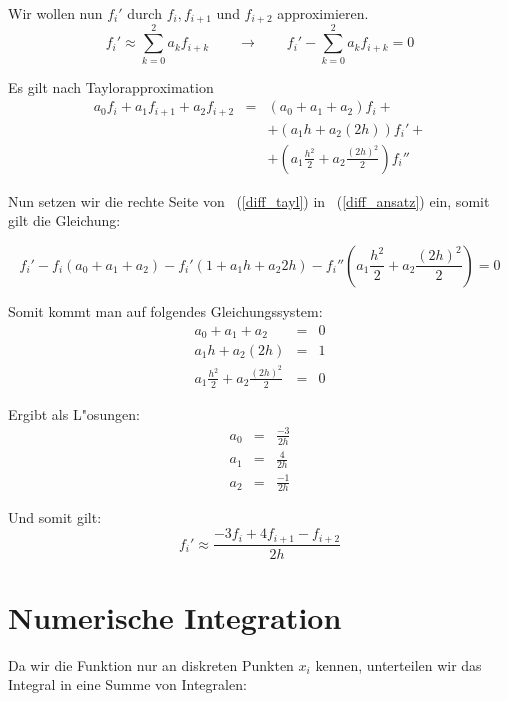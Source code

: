 \documentclass[german, 10pt, a4paper, twocolumn]{scrartcl}
\begin{document}
Wir wollen nun $f_i'$ durch $f_i,f_{i+1}$ und $f_{i+2}$ approximieren.
\begin{equation}
	f_i' \approx \sum^2_{k=0} a_k f_{i+k} \qquad \rightarrow \qquad f_i' - \sum^2_{k=0}a_kf_{i+k} = 0
	\label{diff_ansatz}	
\end{equation}

Es gilt nach Taylorapproximation
\begin{eqnarray}
	a_0f_i+a_1f_{i+1}+a_2f_{i+2} &  = &	(a_0+a_1+a_2)f_i + {} \nonumber \\
	& 				&	+ (a_1h+a_2(2h))f_i' + {} \nonumber \\
	&				&	+ \left ( a_1\frac{h^2}{2}+a_2\frac{(2h)^2}{2} \right ) f_i''
	\label{diff_tayl}
\end{eqnarray}

Nun setzen wir die rechte Seite von ~(\ref{diff_tayl}) in ~(\ref{diff_ansatz}) ein, somit gilt die Gleichung:

\small
\begin{displaymath}
	f_i' - f_i(a_0+a_1+a_2) - f_i'(1+a_1h+a_2 2h)-f_i''\left (a_1\frac{h^2}{2}+a_2\frac{(2h)^2}{2}\right ) = 0
\end{displaymath}
\normalsize

Somit kommt man auf folgendes Gleichungssystem:
\begin{eqnarray}
	a_0+a_1+a_2 &		= &	0 \nonumber \\
	a_1h+ a_2(2h) &		= &	1 \nonumber \\
	a_1\frac{h^2}{2} + a_2\frac{(2h)^2}{2} &	= &	0 \nonumber
\end{eqnarray}

Ergibt als L"osungen:
\begin{eqnarray}
	a_0 &	= &	\frac{-3}{2h} \nonumber \\
	a_1 &	= &	\frac{4}{2h} \nonumber \\
	a_2 &	= &	\frac{-1}{2h} \nonumber
\end{eqnarray}

Und somit gilt:
\begin{displaymath}
	f_i'  \approx \frac{-3f_i+4f_{i+1}-f_{i+2}}{2h}
\end{displaymath}

\section{Numerische Integration}

Da wir die Funktion nur an diskreten Punkten $x_i$ kennen, unterteilen wir das Integral in eine Summe von Integralen:
\end{document}
